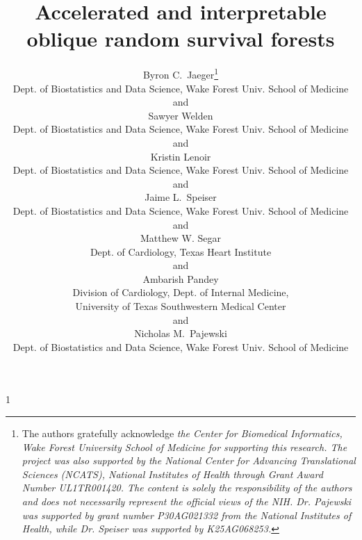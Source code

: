 \documentclass[12pt]{article}\usepackage[]{graphicx}\usepackage[]{xcolor}
\newcommand{\blind}{1}
\begin{document}
%

\def\spacingset#1{\renewcommand{\baselinestretch}%
{#1}\small\normalsize} \spacingset{1}



\blind
{
  \title{\bf Accelerated and interpretable oblique random survival forests}
  \author{Byron C.~Jaeger\thanks{
    The authors gratefully acknowledge \textit{the Center for Biomedical Informatics, Wake Forest University School of Medicine for supporting this research. The project was also supported by the National Center for Advancing Translational Sciences (NCATS), National Institutes of Health through Grant Award Number UL1TR001420. The content is solely the responsibility of the authors and does not necessarily represent the official views of the NIH. Dr. Pajewski was supported by grant number P30AG021332 from the National Institutes of Health, while Dr. Speiser was supported by K25AG068253.}}\hspace{.2cm}\\
   Dept. of Biostatistics and Data Science,
	 Wake Forest Univ. School of Medicine\\
  and \\
   Sawyer Welden \\
   Dept. of Biostatistics and Data Science,
   Wake Forest Univ. School of Medicine \\
  and \\
   Kristin Lenoir \\
   Dept. of Biostatistics and Data Science,
   Wake Forest Univ. School of Medicine\\
  and \\
   Jaime L.~Speiser \\
	 Dept. of Biostatistics and Data Science,
	 Wake Forest Univ. School of Medicine\\
	and \\
	 Matthew W. Segar \\
   Dept. of Cardiology,
   Texas Heart Institute \\
  and \\
   Ambarish Pandey \\
   Division of Cardiology, Dept. of Internal Medicine, \\
   University of Texas Southwestern Medical Center \\
  and \\
   Nicholas M.~Pajewski \\
	 Dept. of Biostatistics and Data Science,
	 Wake Forest Univ. School of Medicine
  }
  \maketitle
} \fi
\end{document}
